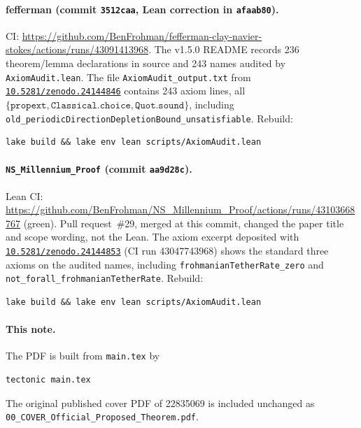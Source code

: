 \documentclass[11pt]{article}
\theoremstyle{plain}
\theoremstyle{definition}
\theoremstyle{remark}
\newcommand{\doi}[1]{\href{https://doi.org/#1}{\texttt{#1}}}
\begin{document}
\paragraph{fefferman (commit \texttt{3512caa}, Lean correction in \texttt{afaab80}).}
CI: \url{https://github.com/BenFrohman/fefferman-clay-navier-stokes/actions/runs/43091413968}. The v1.5.0 README records 236 theorem/lemma declarations in source and 243 names audited by \texttt{AxiomAudit.\hspace{0pt}lean}. The file \texttt{AxiomAudit\_\hspace{0pt}output.\hspace{0pt}txt} from \doi{10.5281/zenodo.24144846} contains 243 axiom lines, all \(\{\texttt{propext},\texttt{Classical.choice},\texttt{Quot.sound}\}\), including \texttt{old\_\hspace{0pt}periodicDirectionDepletionBound\_\hspace{0pt}unsatisfiable}. Rebuild:
\begin{lstlisting}
lake build && lake env lean scripts/AxiomAudit.lean
\end{lstlisting}

\paragraph{\texttt{NS\_Millennium\_Proof} (commit \texttt{aa9d28c}).}
Lean CI: \url{https://github.com/BenFrohman/NS\_Millennium\_Proof/actions/runs/43103668767} (green). Pull request~\#29, merged at this commit, changed the paper title and scope wording, not the Lean. The axiom excerpt deposited with \doi{10.5281/zenodo.24144853} (CI run 43047743968) shows the standard three axioms on the audited names, including \texttt{frohmanianTetherRate\_zero} and \texttt{not\_\hspace{0pt}forall\_\hspace{0pt}frohmanianTetherRate}. Rebuild:
\begin{lstlisting}
lake build && lake env lean scripts/AxiomAudit.lean
\end{lstlisting}

\paragraph{This note.}
The PDF is built from \texttt{main.tex} by
\begin{lstlisting}
tectonic main.tex
\end{lstlisting}
The original published cover PDF of 22835069 is included unchanged as \texttt{00\_\hspace{0pt}COVER\_\hspace{0pt}Official\_\hspace{0pt}Proposed\_\hspace{0pt}Theorem.\hspace{0pt}pdf}.
\end{document}
